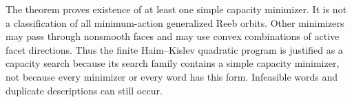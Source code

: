 The theorem proves existence of at least one simple capacity minimizer. It is
not a classification of all minimum-action generalized Reeb orbits. Other
minimizers may pass through nonsmooth faces and may use convex combinations of
active facet directions. Thus the finite Haim--Kislev quadratic program is
justified as a capacity search because its search family contains a simple
capacity minimizer, not because every minimizer or every word has this form.
Infeasible words and duplicate descriptions can still occur.
